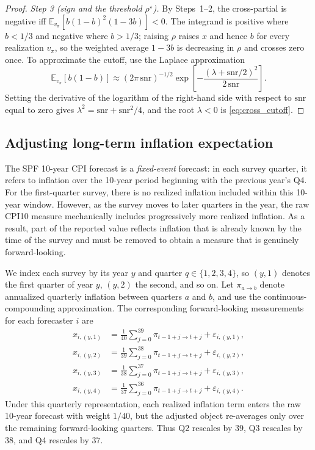 \documentclass[12pt,letter,leqno]{article}
\theoremstyle{asn}
\theoremstyle{lem}
\theoremstyle{slem}
\theoremstyle{prop}
\theoremstyle{appprop}
\theoremstyle{rem}
\theoremstyle{defn}
\begin{document}
\begin{proof}
  \emph{Step 3 (sign and the threshold $\rho^{\star}$).} By Steps~1--2, the
  cross-partial is negative iff $\mathbb{E}_{v_\pi}[b(1-b)^2(1-3b)]<0$. The integrand
  is positive where $b<1/3$ and negative where $b>1/3$; raising $\rho$ raises $x$
  and hence $b$ for every realization $v_\pi$, so the weighted average $1-3b$ is
  decreasing in $\rho$ and crosses zero once. To approximate the cutoff, use the
  Laplace approximation
  \[
  \mathbb{E}_{v_\pi}[b(1-b)]
  \approx
  (2\pi\,\mathrm{snr})^{-1/2}
  \exp\!\left[-\frac{(\lambda+\mathrm{snr}/2)^2}{2\,\mathrm{snr}}\right].
  \]
  Setting the derivative of the logarithm of the right-hand side with respect to
  $\mathrm{snr}$ equal to zero gives
  $\lambda^2=\mathrm{snr}+\mathrm{snr}^2/4$, and the root $\lambda<0$ is
  \eqref{eq:cross_cutoff}. 
  \end{proof}


  \subsection{Adjusting long-term inflation expectation}\label{sec:adjustedCPI10}
  The SPF 10-year CPI forecast is a \emph{fixed-event} forecast: in each survey quarter, it refers to inflation over the 10-year period beginning with the previous year's Q4. For the first-quarter survey, there is no realized inflation included within this 10-year window. However, as the survey moves to later quarters in the year, the raw CPI10 measure mechanically includes progressively more realized inflation. As a result, part of the reported value reflects inflation that is already known by the time of the survey and must be removed to obtain a measure that is genuinely forward-looking.
  
  We index each survey by its year $y$ and quarter $q \in \{1,2,3,4\}$, so $(y,1)$ denotes the first quarter of year $y$, $(y,2)$ the second, and so on.
  Let $\pi_{a \to b}$ denote annualized quarterly inflation between quarters $a$ and $b$, and use the continuous-compounding approximation. The corresponding forward-looking measurements for each forecaster $i$ are
  \begin{align}
  x_{i,(y,1)} &= \frac{1}{40}\sum_{j=0}^{39} \pi_{t-1+j \to t+j}
   + \varepsilon_{i,(y,1)}, \\
  x_{i,(y,2)} &= \frac{1}{39}\sum_{j=0}^{38} \pi_{t-1+j \to t+j}
   + \varepsilon_{i,(y,2)}, \\
  x_{i,(y,3)} &= \frac{1}{38}\sum_{j=0}^{37} \pi_{t-1+j \to t+j}
   + \varepsilon_{i,(y,3)}, \\
  x_{i,(y,4)} &= \frac{1}{37}\sum_{j=0}^{36} \pi_{t-1+j \to t+j}
   + \varepsilon_{i,(y,4)}.
  \end{align}
  Under this quarterly representation, each realized inflation term enters the raw 10-year forecast with weight $1/40$, but the adjusted object re-averages only over the remaining forward-looking quarters. Thus Q2 rescales by $39$, Q3 rescales by $38$, and Q4 rescales by $37$. 
  
\end{document}
